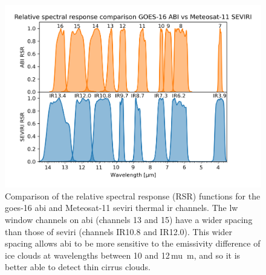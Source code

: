 
\begin{figure}[tp]
    \includegraphics[width=\textwidth]{figures/chapter4_05.png}
    \caption[
    Comparison of the relative spectral response (RSR) functions for the \acrshort{goes}-16 \acrshort{abi} and Meteosat-11 \acrshort{seviri} thermal \acrshort{ir} channels
    ]{
    Comparison of the relative spectral response (RSR) functions for the \acrshort{goes}-16 \acrshort{abi} and Meteosat-11 \acrshort{seviri} thermal \acrshort{ir} channels. The \acrshort{lw} window channels on \acrshort{abi} (channels 13 and 15) have a wider spacing than those of \acrshort{seviri} (channels IR10.8 and IR12.0). This wider spacing allows \acrshort{abi} to be more sensitive to the emissivity difference of ice clouds at wavelengths between 10 and 12\,\unit{mu m}, and so it is better able to detect thin cirrus clouds.}
    \label{fig:S_abi_seviri_rsr}
\end{figure}


